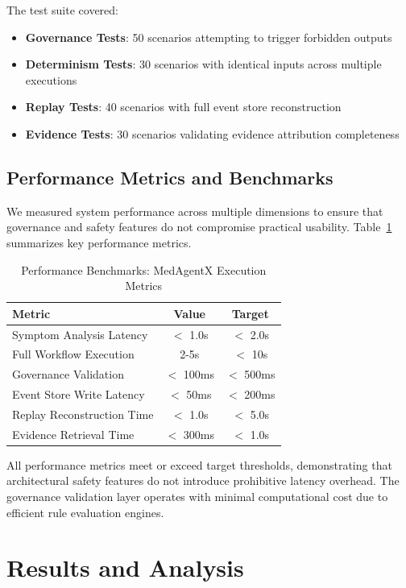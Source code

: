\documentclass[journal]{IEEEtran}
\begin{document}
The test suite covered:
\begin{itemize}
    \item \textbf{Governance Tests}: 50 scenarios attempting to trigger forbidden outputs
    \item \textbf{Determinism Tests}: 30 scenarios with identical inputs across multiple executions
    \item \textbf{Replay Tests}: 40 scenarios with full event store reconstruction
    \item \textbf{Evidence Tests}: 30 scenarios validating evidence attribution completeness
\end{itemize}

\subsection{Performance Metrics and Benchmarks}
We measured system performance across multiple dimensions to ensure that governance and safety features do not compromise practical usability. Table~\ref{tab:performance} summarizes key performance metrics.

\begin{table}[H]
\centering
\caption{Performance Benchmarks: MedAgentX Execution Metrics}
\label{tab:performance}
\small
\begin{tabular}{lcc}
\toprule
\textbf{Metric} & \textbf{Value} & \textbf{Target} \\
\midrule
Symptom Analysis Latency & $<$ 1.0s & $<$ 2.0s \\
Full Workflow Execution & 2-5s & $<$ 10s \\
Governance Validation & $<$ 100ms & $<$ 500ms \\
Event Store Write Latency & $<$ 50ms & $<$ 200ms \\
Replay Reconstruction Time & $<$ 1.0s & $<$ 5.0s \\
Evidence Retrieval Time & $<$ 300ms & $<$ 1.0s \\
\bottomrule
\end{tabular}
\end{table}

All performance metrics meet or exceed target thresholds, demonstrating that architectural safety features do not introduce prohibitive latency overhead. The governance validation layer operates with minimal computational cost due to efficient rule evaluation engines.

\newpage
\section{Results and Analysis}
\end{document}
